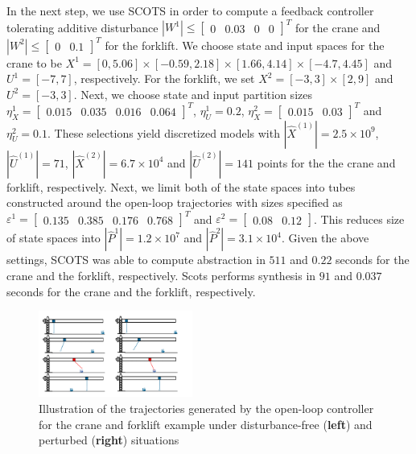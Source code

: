 In the next step, we use SCOTS in order to compute a feedback controller tolerating additive disturbance $|W^1|\leq\begin{bmatrix}0&0.03&0&0\end{bmatrix}^T$ for the crane and $|W^2|\leq\begin{bmatrix}0&0.1\end{bmatrix}^T$ for the forklift. %
We choose state and input spaces for the crane to be $X^{1}=[0,5.06]\times[-0.59,2.18]\times[1.66,4.14]\times[-4.7,4.45]$ and $U^{1}=[-7,7]$, respectively. For the forklift, we set $X^{2}=[-3,3]\times[2,9]$ and $U^{2}=[-3,3]$. %
Next, we choose state and input partition sizes $\eta_{{X}}^{1}=\begin{bmatrix}0.015&0.035&0.016&0.064\end{bmatrix}^T$, $\eta_{U}^1=0.2$,  $\eta_{{X}}^2=\begin{bmatrix}0.015&0.03\end{bmatrix}^T$ and $\eta_{U}^2=0.1$. These selections yield discretized models with $|\hat X^{(1)}|=2.5\times 10^9$, $|\hat U^{(1)}|=71$, $|\hat X^{(2)}|=6.7\times 10^4$ and $|\hat U^{(2)}|=141$ points for the the crane and forklift, respectively. Next, we limit both of the state spaces into tubes constructed around the open-loop trajectories with sizes specified as $\varepsilon^{1}=\begin{bmatrix}0.135&0.385&0.176 &0.768\end{bmatrix}^T$ and $\varepsilon^{2}=\begin{bmatrix}0.08&0.12\end{bmatrix}$. This reduces size of state spaces into $|\hat P^{1}|=1.2\times 10^7$ and $|\hat P^{2}|=3.1\times 10^4$. Given the above settings, SCOTS was able to compute abstraction in $511$ and $0.22$ seconds for the crane and the forklift, respectively. Scots performs synthesis in $91$ and $0.037$ seconds for the crane and the forklift, respectively.
			
\begin{figure}[t]
	\centering
	\includegraphics[width=0.45\textwidth]{figures/crane_and_forklifter.pdf}
	\caption{Illustration of the trajectories generated by the open-loop controller for the crane and forklift example under disturbance-free (\textbf{left}) and perturbed (\textbf{right}) situations} 
\end{figure}\label{fig:cr_and_lft_2}


